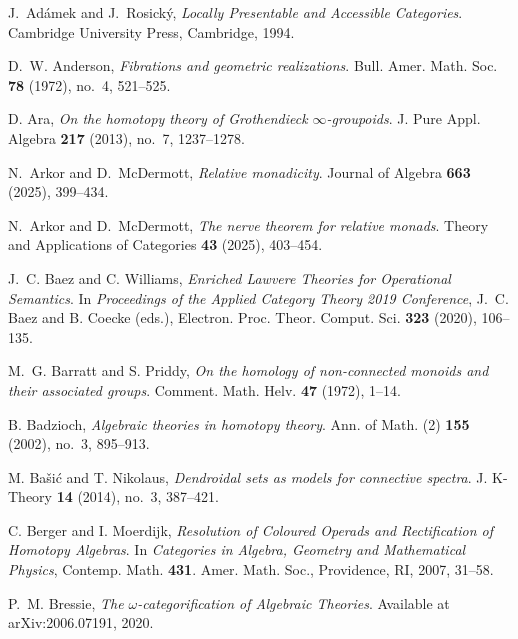 \documentclass{tac}
\begin{document}
\begin{references*}
J.~Ad\'{a}mek and J.~Rosick\'{y},
\emph{Locally Presentable and Accessible Categories}.
Cambridge University Press, Cambridge, 1994.

D.~W. Anderson,
\emph{Fibrations and geometric realizations}.
Bull. Amer. Math. Soc. \textbf{78} (1972), no.~4, 521--525.

D. Ara,
\emph{On the homotopy theory of Grothendieck $\infty$-groupoids}.
J. Pure Appl. Algebra \textbf{217} (2013), no.~7, 1237--1278.

N.~Arkor and D.~McDermott,
\emph{Relative monadicity}.
Journal of Algebra \textbf{663} (2025), 399--434.

N.~Arkor and D.~McDermott,
\emph{The nerve theorem for relative monads}.
Theory and Applications of Categories \textbf{43} (2025), 403--454.

J.~C. Baez and C. Williams,
\emph{Enriched Lawvere Theories for Operational Semantics}.
In \emph{Proceedings of the Applied Category Theory 2019 Conference},
J.~C. Baez and B. Coecke (eds.),
Electron. Proc. Theor. Comput. Sci. \textbf{323} (2020), 106--135.

M.~G. Barratt and S. Priddy,
\emph{On the homology of non-connected monoids and their associated groups}.
Comment. Math. Helv. \textbf{47} (1972), 1--14.

B. Badzioch,
\emph{Algebraic theories in homotopy theory}.
Ann. of Math. (2) \textbf{155} (2002), no.~3, 895--913.

M. Ba\v{s}i\'c and T. Nikolaus,
\emph{Dendroidal sets as models for connective spectra}.
J. K-Theory \textbf{14} (2014), no.~3, 387--421.

C. Berger and I. Moerdijk,
\emph{Resolution of Coloured Operads and Rectification of Homotopy Algebras}.
In \emph{Categories in Algebra, Geometry and Mathematical Physics},
Contemp. Math. \textbf{431}.
Amer. Math. Soc., Providence, RI, 2007, 31--58.

P.~M. Bressie,
\emph{The $\omega$-categorification of Algebraic Theories}.
Available at arXiv:2006.07191, 2020.


\end{references*}
\end{document}
